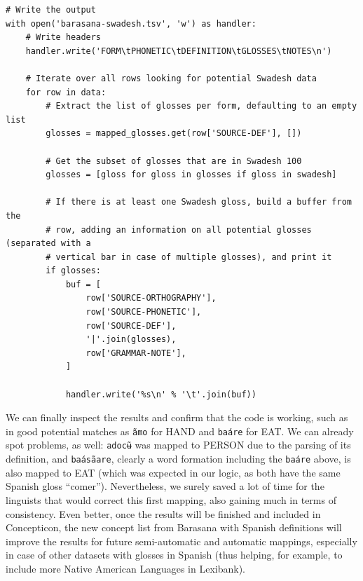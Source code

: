 \documentclass[
  a4paper,
  14pt,
  oneside,
  tablecaptionabove
]{scrbook}
\begin{document}
\begin{lstlisting}
# Write the output
with open('barasana-swadesh.tsv', 'w') as handler:
    # Write headers
    handler.write('FORM\tPHONETIC\tDEFINITION\tGLOSSES\tNOTES\n')

    # Iterate over all rows looking for potential Swadesh data
    for row in data:
        # Extract the list of glosses per form, defaulting to an empty list
        glosses = mapped_glosses.get(row['SOURCE-DEF'], [])

        # Get the subset of glosses that are in Swadesh 100
        glosses = [gloss for gloss in glosses if gloss in swadesh]

        # If there is at least one Swadesh gloss, build a buffer from the
        # row, adding an information on all potential glosses (separated with a
        # vertical bar in case of multiple glosses), and print it
        if glosses:
            buf = [
                row['SOURCE-ORTHOGRAPHY'],
                row['SOURCE-PHONETIC'],
                row['SOURCE-DEF'],
                '|'.join(glosses),
                row['GRAMMAR-NOTE'],
            ]

            handler.write('%s\n' % '\t'.join(buf))
\end{lstlisting}

We can finally inspect the results and confirm that the code is working,
such as in good potential matches as \texttt{ãmo} for
HAND and \texttt{baáre} for EAT. We can already spot
problems, as well: \texttt{adocʉ̃} was mapped to PERSON
due to the parsing of its definition, and
\texttt{baásãare}, clearly a word formation including
the \texttt{baáre} above, is also mapped to EAT (which
was expected in our logic, as both have the same Spanish gloss
\enquote{comer}). Nevertheless, we surely saved a lot of time for the
linguists that would correct this first mapping, also gaining much in
terms of consistency. Even better, once the results will be finished and
included in Concepticon, the new concept list from Barasana with Spanish
definitions will improve the results for future semi-automatic and
automatic mappings, especially in case of other datasets with glosses in
Spanish (thus helping, for example, to include more Native American
Languages in Lexibank).
\end{document}
